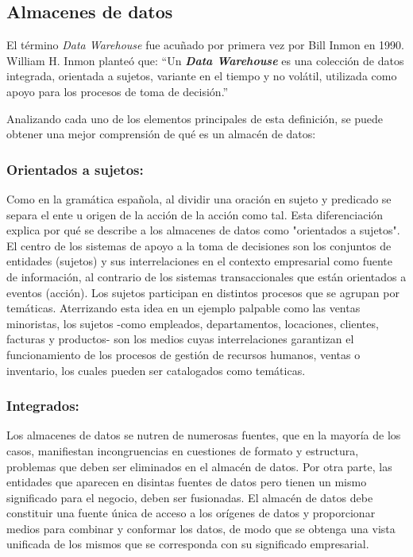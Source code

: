 \subsection{Almacenes de datos}

El término \emph{Data Warehouse} fue acuñado por primera vez por Bill Inmon en 1990. William H. Inmon planteó que: 
“Un \textbf{\emph{Data Warehouse}} es una colección de datos integrada, orientada a sujetos, variante en el tiempo y 
no volátil, utilizada como apoyo para los procesos de toma de decisión.”

Analizando cada uno de los elementos principales de esta definición, se puede obtener una mejor comprensión de qué es un 
almacén de datos:

\subsubsection{Orientados a sujetos:}
%
Como en la gramática española, al dividir una oración en sujeto y predicado se separa el ente u origen de la acci\'on 
de la acci\'on como tal. Esta diferenciación explica por qué se describe a los almacenes de datos como "orientados a sujetos". 
El centro de los sistemas de apoyo a la toma de decisiones son los conjuntos de entidades (sujetos) y sus interrelaciones 
en el contexto empresarial como fuente de información, al contrario de los sistemas transaccionales que est\'an orientados a eventos 
(acci\'on). Los sujetos participan en distintos procesos que se agrupan por 
tem\'aticas. Aterrizando esta idea en un ejemplo palpable como las ventas minoristas, los sujetos -como empleados, departamentos, 
locaciones, clientes, facturas y productos- son los medios cuyas interrelaciones garantizan el funcionamiento de los procesos de 
gestión de recursos humanos, ventas o inventario, los cuales pueden ser catalogados como tem\'aticas. 

\subsubsection{Integrados:}
Los almacenes de datos se nutren de numerosas fuentes, que en la mayor\'ia de los casos, manifiestan 
incongruencias en cuestiones de formato y estructura, problemas que deben ser eliminados en el almac\'en de datos.
Por otra parte, las entidades que aparecen en disintas fuentes de datos pero tienen un mismo significado para el 
negocio, deben ser fusionadas. El almac\'en de datos debe constituir una fuente \'unica de acceso a los or\'igenes de datos 
y proporcionar medios para combinar y conformar los datos, de modo que se obtenga una vista unificada de los mismos que se 
corresponda con su significado empresarial.

